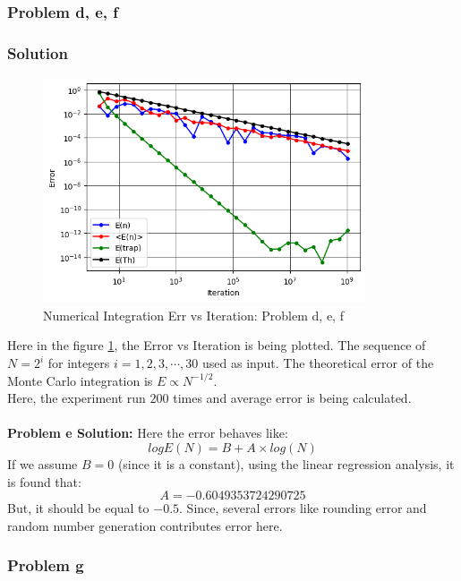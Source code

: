 \documentclass{article}
\begin{document}
\subsubsection*{Problem d, e, f} 
\subsubsection*{Solution}
\begin{figure}[h!]
  \centering
    \includegraphics[width=0.85\textwidth]{Numerical_Intergration_Err_vs_Iteration.png}
    \caption{Numerical Integration Err vs Iteration: Problem d, e, f} 
    \label{EvsN}
\end{figure}
Here in the figure \ref{EvsN}, the Error vs Iteration is being plotted. The sequence of $N = 2^i$ for integers $i = 1, 2, 3,\cdots,30$ used as input. The theoretical error of the Monte Carlo integration is $E \propto N^{-1/2} $. \\
Here, the experiment run $200$ times and average error is being calculated.
\\
\\
\textbf{Problem e Solution:}
Here the error behaves like: 
$$
logE(N) = B + A\times log(N)
$$
If we assume $B = 0$ (since it is a constant), using the linear regression analysis, it is found that: 
$$A = -0.6049353724290725$$
But, it should be equal to $-0.5$. Since, several errors like rounding error and random number 
generation contributes error here. 
\subsubsection*{Problem g} 
\end{document}
